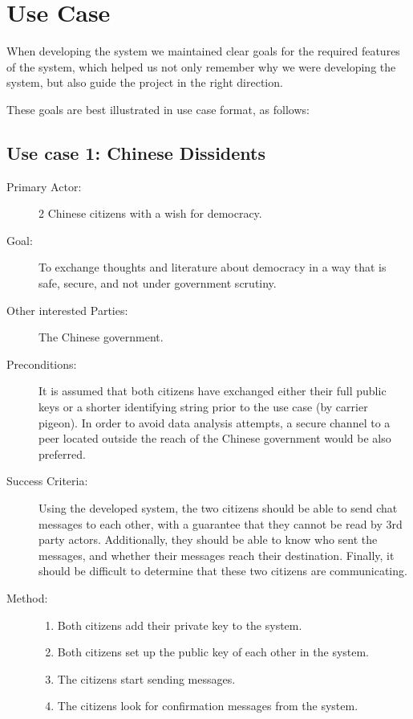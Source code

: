 \section{Use Case}

When developing the system we maintained clear goals for the required features of the system, which helped us not only remember why we were developing the system, but also guide the project in the right direction.

These goals are best illustrated in use case format, as follows:

\subsection{Use case 1: Chinese Dissidents}
\begin{description}
\item[Primary Actor:] 2 Chinese citizens with a wish for democracy.
\item[Goal:] To exchange thoughts and literature about democracy in a way that is safe, secure, and not under government scrutiny.
\item[Other interested Parties:] The Chinese government.
\item[Preconditions:] It is assumed that both citizens have exchanged either their full public keys or a shorter identifying string prior to the use case (by carrier pigeon).
In order to avoid data analysis attempts, a secure channel to a peer located outside the reach of the Chinese government would be also preferred.
\item[Success Criteria:] Using the developed system, the two citizens should be able to send chat messages to each other, with a guarantee that they cannot be read by 3rd party actors.
Additionally, they should be able to know who sent the messages, and whether their messages reach their destination.
Finally, it should be difficult to determine that these two citizens are communicating.
\item[Method:]
\begin{enumerate}
\item Both citizens add their private key to the system.
\item Both citizens set up the public key of each other in the system.
\item The citizens start sending messages.
\item The citizens look for confirmation messages from the system.
\end{enumerate}
\end{description}

